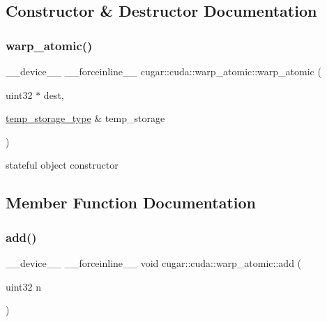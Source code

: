 \subsection{Constructor \& Destructor Documentation}
\mbox{\label{structcugar_1_1cuda_1_1warp__atomic_a26f81f49b364ae0054bd0064094202e3}} 
\subsubsection{\texorpdfstring{warp\+\_\+atomic()}{warp\_atomic()}}
{\footnotesize\ttfamily \+\_\+\+\_\+device\+\_\+\+\_\+ \+\_\+\+\_\+forceinline\+\_\+\+\_\+ cugar\+::cuda\+::warp\+\_\+atomic\+::warp\+\_\+atomic (\begin{DoxyParamCaption}\item[{uint32 $\ast$}]{dest,  }\item[{\hyperlink{structcugar_1_1cuda_1_1warp__atomic_1_1temp__storage__type}{temp\+\_\+storage\+\_\+type} \&}]{temp\+\_\+storage }\end{DoxyParamCaption})\hspace{0.3cm}{\ttfamily [inline]}}

stateful object constructor 

\subsection{Member Function Documentation}
\mbox{\label{structcugar_1_1cuda_1_1warp__atomic_a51a7e5ec2300729a4569caccb4347320}} 
\subsubsection{\texorpdfstring{add()}{add()}\hspace{0.1cm}{\footnotesize\ttfamily [1/6]}}
{\footnotesize\ttfamily \+\_\+\+\_\+device\+\_\+\+\_\+ \+\_\+\+\_\+forceinline\+\_\+\+\_\+ void cugar\+::cuda\+::warp\+\_\+atomic\+::add (\begin{DoxyParamCaption}\item[{uint32}]{n }\end{DoxyParamCaption})\hspace{0.3cm}{\ttfamily [inline]}}

